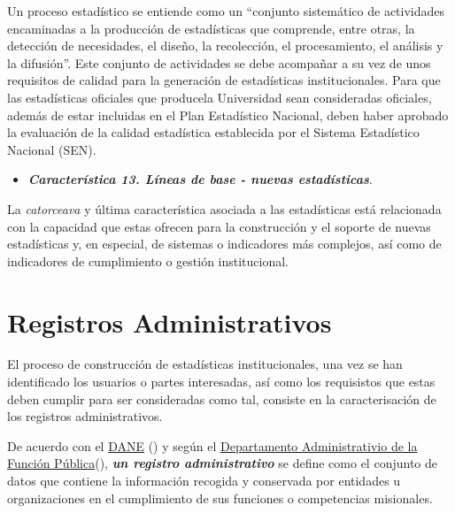 \documentclass[
]{book}
\providecommand{\tightlist}{%
  \setlength{\itemsep}{0pt}\setlength{\parskip}{0pt}}
\begin{document}
Un proceso estadístico se entiende como un ``conjunto sistemático de actividades encaminadas a la producción de estadísticas que comprende, entre otras, la detección de necesidades, el diseño, la recolección, el procesamiento, el análisis y la difusión''. Este conjunto de actividades se debe acompañar a su vez de unos requisitos de calidad para la generación de estadísticas institucionales. Para que las estadísticas oficiales que producela Universidad sean consideradas oficiales, además de estar incluidas en el Plan Estadístico Nacional, deben haber aprobado la evaluación de la calidad estadística establecida por el Sistema Estadístico Nacional (SEN).

\begin{itemize}
\tightlist
\item
  \textbf{\emph{Característica 13. Líneas de base - nuevas estadísticas}}.
\end{itemize}

La \emph{catorceava} y última característica asociada a las estadísticas está relacionada con la capacidad que estas ofrecen para la construcción y el soporte de nuevas estadísticas y, en especial, de sistemas o indicadores más complejos, así como de indicadores de cumplimiento o gestión institucional.

\hypertarget{registros-administrativos}{%
\section{Registros Administrativos}\label{registros-administrativos}}

El proceso de construcción de estadísticas institucionales, una vez se han identificado los usuarios o partes interesadas, así como los requisistos que estas deben cumplir para ser consideradas como tal, consiste en la caracterisación de los registros administrativos.

De acuerdo con el \href{https://www.dane.gov.co/index.php/sistema-estadistico-nacional-sen/registros-administrativos/documentacion-registros-administrativos}{DANE} (\citet{Registros}) y según el \href{https://www.funcionpublica.gov.co/VisualSIE/faces/javax.faces.resource/docs/Documento_operaciones_estadisticas_y_registros_administrativos.pdf}{Departamento Administrativio de la Función Pública}(\citet{RegistrosDAFP}), \textbf{\emph{un registro administrativo}} se define como el conjunto de datos que contiene la información recogida y conservada por entidades u organizaciones en el cumplimiento de sus funciones o competencias misionales.
\end{document}
